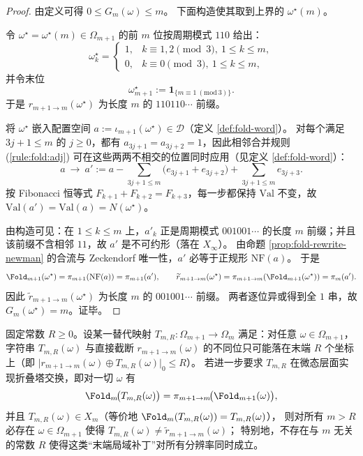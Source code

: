 \begin{proof}
由定义可得 \(0\le G_m(\omega)\le m\)。
下面构造使其取到上界的 \(\omega^\star(m)\)。
\par
令 \(\omega^\star=\omega^\star(m)\in\Omega_{m+1}\) 的前 \(m\) 位按周期模式 \(110\) 给出：
$$
\omega^\star_k=
\begin{cases}
1,& k\equiv 1,2\pmod 3,\ 1\le k\le m,\\
0,& k\equiv 0\pmod 3,\ 1\le k\le m,
\end{cases}
$$
并令末位
$$
\omega^\star_{m+1}:=\mathbf{1}_{\{m\equiv 1\ (\mathrm{mod}\ 3)\}}.
$$
于是 \(r_{m+1\to m}(\omega^\star)\) 为长度 \(m\) 的 \(110110\cdots\) 前缀。
\par
将 \(\omega^\star\) 嵌入配置空间 \(a:=\iota_{m+1}(\omega^\star)\in\mathcal D\)（定义 \ref{def:fold-word}）。
对每个满足 \(3j+1\le m\) 的 \(j\ge 0\)，都有 \(a_{3j+1}=a_{3j+2}=1\)，因此相邻合并规则 (\ref{rule:fold:adj}) 可在这些两两不相交的位置同时应用（见定义 \ref{def:fold-word}）：
$$
a\ \to\ a':=a-\sum_{3j+1\le m}\bigl(e_{3j+1}+e_{3j+2}\bigr)+\sum_{3j+1\le m}e_{3j+3}.
$$
按 Fibonacci 恒等式 \(F_{k+1}+F_{k+2}=F_{k+3}\)，每一步都保持 \(\mathrm{Val}\) 不变，故 \(\mathrm{Val}(a')=\mathrm{Val}(a)=N(\omega^\star)\)。
\par
由构造可见：在 \(1\le k\le m\) 上，\(a'_k\) 正是周期模式 \(001001\cdots\) 的长度 \(m\) 前缀；并且该前缀不含相邻 \(11\)，故 \(a'\) 是不可约形（落在 \(X_\infty\)）。
由命题 \ref{prop:fold-rewrite-newman} 的合流与 Zeckendorf 唯一性，\(a'\) 必等于正规形 \(\mathrm{NF}(a)\)。
于是
$$
\Fold_{m+1}(\omega^\star)=\pi_{m+1}(\mathrm{NF}(a))=\pi_{m+1}(a'),
\qquad
\widetilde r_{m+1\to m}(\omega^\star)=\pi_{m+1\to m}(\Fold_{m+1}(\omega^\star))=\pi_m(a').
$$
因此 \(\widetilde r_{m+1\to m}(\omega^\star)\) 为长度 \(m\) 的 \(001001\cdots\) 前缀。
两者逐位异或得到全 \(1\) 串，故 \(G_m(\omega^\star)=m\)。证毕。
\end{proof}

\begin{corollary}\label{cor:fold-tail-patch-incomplete}
固定常数 \(R\ge 0\)。设某一替代映射 \(T_{m,R}:\Omega_{m+1}\to\Omega_m\) 满足：对任意 \(\omega\in\Omega_{m+1}\)，字符串 \(T_{m,R}(\omega)\) 与直接截断 \(r_{m+1\to m}(\omega)\) 的不同位只可能落在末端 \(R\) 个坐标上（即
\(\bigl|r_{m+1\to m}(\omega)\oplus T_{m,R}(\omega)\bigr|_0\le R\)）。
若进一步要求 \(T_{m,R}\) 在微态层面实现折叠塔交换，即对一切 \(\omega\) 有
\[
\Fold_m\!\bigl(T_{m,R}(\omega)\bigr)=\pi_{m+1\to m}\!\bigl(\Fold_{m+1}(\omega)\bigr),
\]
并且 \(T_{m,R}(\omega)\in X_m\)（等价地 \(\Fold_m(T_{m,R}(\omega))=T_{m,R}(\omega)\)），
则对所有 \(m>R\) 必存在 \(\omega\in\Omega_{m+1}\) 使得 \(T_{m,R}(\omega)\ne \widetilde r_{m+1\to m}(\omega)\)；
特别地，不存在与 \(m\) 无关的常数 \(R\) 使得这类“末端局域补丁”对所有分辨率同时成立。
\end{corollary}

